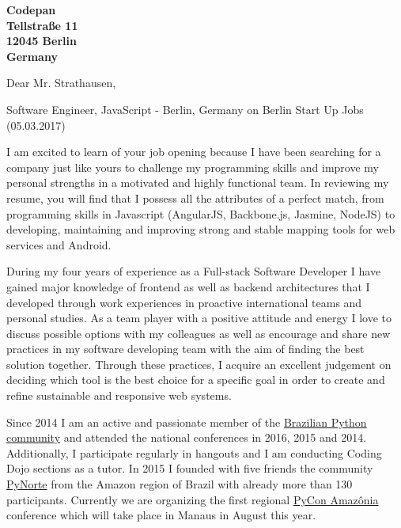 \documentclass[a4paper]{joaosoares-letter}
\begin{document}
\longindentation=0pt


\begin{letter}{\bfseries Codepan\\Tellstraße 11\\12045 Berlin\\Germany}


\date{Belém, \today}


\opening{Dear Mr. Strathausen,}{Software Engineer, JavaScript - Berlin, Germany on Berlin Start Up Jobs (05.03.2017)}

I am excited to learn of your job opening because I have been searching for a company just like yours to challenge my programming skills and improve my personal strengths in a motivated and highly functional team. In reviewing my resume, you will find that I possess all the attributes of a perfect match, from programming skills in Javascript (AngularJS, Backbone.js, Jasmine, NodeJS) to developing, maintaining and improving strong and stable mapping tools for web services and Android.

During my four years of experience as a Full-stack Software Developer I have gained major knowledge of frontend as well as backend architectures that I developed through work experiences in proactive international teams and personal studies. As a team player with a positive attitude and energy I love to discuss possible options with my colleagues as well as encourage and share new practices in my software developing team with the aim of finding the best solution together. Through these practices, I acquire an excellent judgement on deciding which tool is the best choice for a specific goal in order to create and refine sustainable and responsive web systems.

Since 2014 I am an active and passionate member of the \href{http://python.org.br}{Brazilian Python community} and attended the national conferences in 2016, 2015 and 2014. Additionally, I participate regularly in hangouts and I am conducting Coding Dojo sections as a tutor. In 2015 I founded with five friends the community \href{http://pynorte.python.org.br}{PyNorte} from the Amazon region of Brazil with already more than 130 participants. Currently we are organizing the first regional \href{http://amazonia.python.org.br/}{PyCon Amazônia} conference which will take place in Manaus in August this year.


\end{letter}
\end{document}
